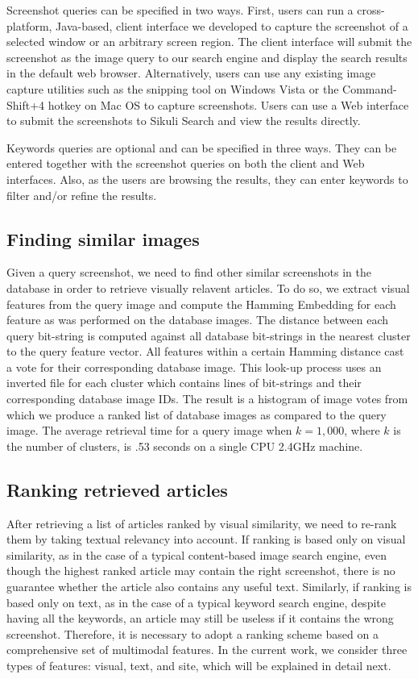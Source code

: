 \documentclass{www2010-submission}
\begin{document}
Screenshot queries can be specified in two ways. First, users can
run a cross-platform, Java-based, client interface we developed to
capture the screenshot of a selected window or an arbitrary screen
region. The client interface will submit the screenshot as the
image query to our search engine and display the search results in the
default web browser. Alternatively, users can use any existing
image capture utilities such as the snipping tool on Windows Vista
or the Command-Shift+4 hotkey on Mac OS to capture screenshots.
Users can use a Web interface to submit the screenshots to Sikuli
Search and view the results directly.

Keywords queries are optional and can be specified in three ways.
They can be entered together with the screenshot queries on both
the client and Web interfaces. Also, as the users are browsing the
results, they can enter keywords to filter and/or refine the
results.

\subsection{Finding similar images}
\label{sec:finding_similar_images}

Given a query screenshot, we need to find other similar screenshots in
the database in order to retrieve visually relavent articles.  To do
so, we extract visual features from the query image and compute the Hamming
Embedding for each feature as was performed on the database images.
The distance between each query bit-string is computed against all
database bit-strings in the nearest cluster to the query feature
vector.  All features within a certain Hamming distance cast a vote
for their corresponding database image.  This look-up process uses an
inverted file for each cluster which contains lines of bit-strings and
their corresponding database image IDs.  The result is a histogram of
image votes from which we produce a ranked list of database images as
compared to the query image. The average retrieval time for a query
image when $k=1,000$, where $k$ is the number of clusters, is .53
seconds on a single CPU 2.4GHz machine.

\subsection{Ranking retrieved articles}
\label{sec:ranking_retrieved_articles}

After retrieving a list of articles ranked by visual similarity, we
need to re-rank them by taking textual relevancy into account.  If
ranking is based only on visual similarity, as in the case of a
typical content-based image search engine, even though the highest
ranked article may contain the right screenshot, there is no guarantee
whether the article also contains any useful text. Similarly, if
ranking is based only on text, as in the case of a typical keyword
search engine, despite having all the keywords, an article may still
be useless if it contains the wrong screenshot. Therefore, it is
necessary to adopt a ranking scheme based on a comprehensive set of
multimodal features. In the current work, we consider three types of
features: visual, text, and site, which will be explained in detail
next.
\end{document}
